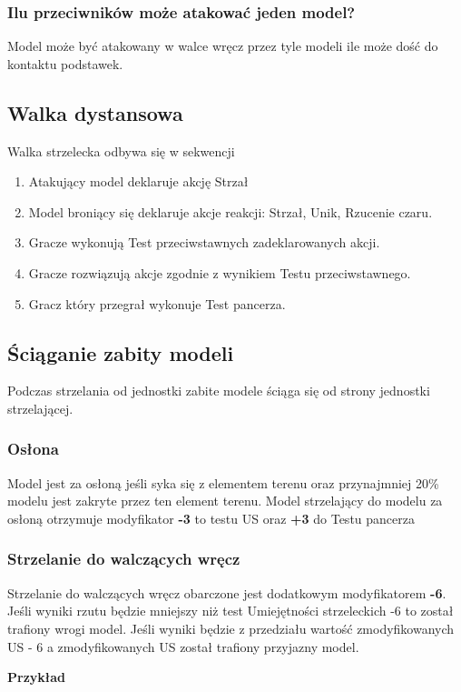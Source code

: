 \subsubsection{Ilu przeciwników może atakować jeden model?} Model może być atakowany w walce wręcz przez tyle modeli ile może dość do kontaktu podstawek. 

\subsection{Walka dystansowa}
Walka strzelecka odbywa się w sekwencji
\begin{enumerate}
    \item Atakujący model deklaruje akcję Strzał
    \item Model broniący się deklaruje akcje reakcji: Strzał, Unik, Rzucenie czaru. 
    \item Gracze wykonują Test przeciwstawnych zadeklarowanych akcji.
    \item Gracze rozwiązują akcje zgodnie z wynikiem Testu przeciwstawnego. 
    \item Gracz który przegrał wykonuje Test pancerza.
\end{enumerate}

\subsection{Ściąganie zabity modeli}
Podczas strzelania od jednostki zabite modele ściąga się od strony jednostki strzelającej. 

\subsubsection{Osłona}
Model jest za osłoną jeśli syka się z elementem terenu oraz przynajmniej 20\% modelu jest zakryte przez ten element terenu. Model strzelający do modelu za osłoną otrzymuje modyfikator \textbf{-3} to testu US oraz \textbf{+3} do Testu pancerza

\subsubsection{Strzelanie do walczących wręcz}
Strzelanie do walczących wręcz obarczone jest dodatkowym modyfikatorem \textbf{-6}. Jeśli wyniki rzutu będzie mniejszy niż test Umiejętności strzeleckich -6 to został trafiony wrogi model. Jeśli wyniki będzie z przedziału wartość zmodyfikowanych US - 6 a zmodyfikowanych US został trafiony przyjazny model. 

\textbf{Przykład}